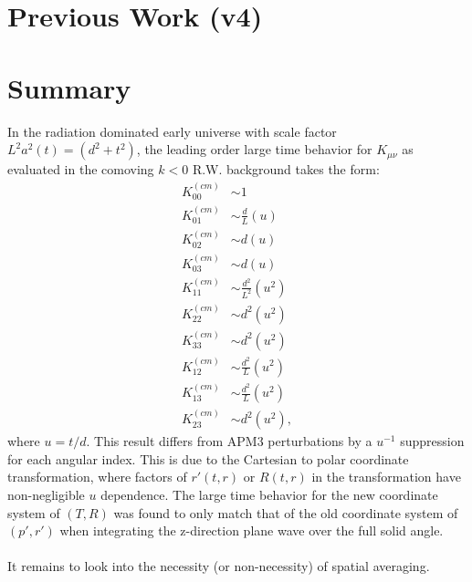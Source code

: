 \documentclass[10pt,letterpaper]{article}
\begin{document}
\newpage
\section*{Previous Work (v4)}
\section*{Summary}
In the radiation dominated early universe with scale factor $L^2 a^2(t) =(d^2+t^2)$, the leading order large time behavior for $K_{\mu\nu}$ as evaluated in the comoving $k<0$ R.W. background takes the form:
\begin{align}
K^{(cm)}_{00} &\sim 1 \nonumber\\
K^{(cm)}_{01} &\sim \frac{d}{L}(u) \nonumber\\
K^{(cm)}_{02} &\sim d(u) \nonumber\\
K^{(cm)}_{03} &\sim d(u) \nonumber\\
K^{(cm)}_{11} &\sim \frac{d^2}{L^2}(u^2) \nonumber\\
K^{(cm)}_{22} &\sim d^2(u^2) \nonumber\\
K^{(cm)}_{33} &\sim d^2(u^2) \nonumber\\
K^{(cm)}_{12} &\sim \frac{d^2}{L}(u^2) \nonumber\\
K^{(cm)}_{13} &\sim \frac{d^2}{L}(u^2) \nonumber\\
K^{(cm)}_{23} &\sim d^2(u^2),
\end{align}
where $u = t/d$. This result differs from APM3 perturbations by a $u^{-1}$ suppression for each angular index. This is due to the Cartesian to polar coordinate transformation, where factors of $r'(t,r)$ or $R(t,r)$ in the transformation have non-negligible $u$ dependence. The large time behavior for the new coordinate system of $(T,R)$ was found to only match that of the old coordinate system of $(p',r')$ when integrating the z-direction plane wave over the full solid angle. 
\\ \\
It remains to look into the necessity (or non-necessity) of spatial averaging. 
\end{document}
